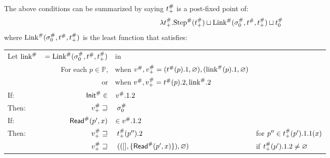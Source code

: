 The above conditions can be summarized by saying ${t}^{\#}_+$ is a post-fixed point of:
\[\lambda{t}^{\#}_+.{\text{Step}}^{\#}({t}^{\#}_+)\sqcup{\text{Link}}^{\#}({\sigma}^{\#}_0,{t}^{\#},{t}^{\#}_+)\sqcup{t}^{\#}_0\]
where ${\text{Link}}^{\#}({\sigma}^{\#}_0,{t}^{\#},{t}^{\#}_+)$ is the least function that satisfies:
\begin{center}
  \begin{tabular}{|l@{\hskip2pt}r@{\hskip2pt}l@{\hskip2pt}l|}
    \hline
    Let ${\text{link}}^{\#}$ & $={\text{Link}}^{\#}({\sigma}^{\#}_0,{t}^{\#},{t}^{\#}_+)$ & in                                                                                  &                                                              \\
                    & For each $p\in\mathbb{P}$,                       & when ${v}^{\#},{v}^{\#}_+=({t}^{\#}(p).1,\varnothing),({\text{link}}^{\#}(p).1,\varnothing)$ &                                                              \\
                    & or                                               & when ${v}^{\#},{v}^{\#}_+={t}^{\#}(p).2,{\text{link}}^{\#}.2$                                &                                                              \\
    \hline
    If:             & ${\textsf{Init}}^{\#}\in$                                  & ${v}^{\#}.1.2$                                                                       &                                                              \\
    Then:           & ${v}^{\#}_+\sqsupseteq$                           & $\:{\sigma}^{\#}_0$                                                                      &                                                              \\
    \hline
    If:             & ${\textsf{Read}}^{\#}(p',x)$                               & $\in{v}^{\#}.1.2$                                                                    &                                                              \\
    Then:           & ${v}^{\#}_+\sqsupseteq$                           & $\:{t}^{\#}_+(p'').2$                                                             & for $p''\in{t}^{\#}_+(p').1.1(x)$                          \\
                    & ${v}^{\#}_+\sqsupseteq$                           & $\:(([],\{{\textsf{Read}}^{\#}(p',x)\}),\varnothing)$                                         & if ${t}^{\#}_+(p').1.2\neq\varnothing$                     \\
    \hline

\end{tabular}
\end{center}
